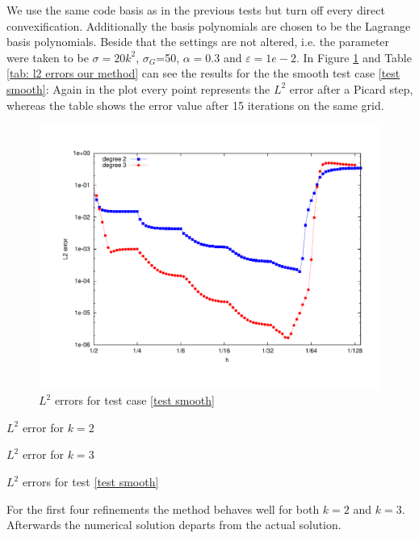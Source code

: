 We use the same code basis as in the previous tests but turn off every direct convexification. Additionally the basis polynomials are chosen to be the Lagrange basis polynomials. Beside that the settings are not altered, i.e. the parameter were taken to be $\sigma = 20 k^2$, $\sigma_G$=50, $\alpha=0.3$ and $\varepsilon = 1e-2$. 
In Figure \ref{fig: l2 errors test smooth ourMethod} and Table \ref{tab: l2 errors our method} can see the results for the the smooth test case \ref{test smooth}: Again in the plot every point represents the $L^2$ error after a Picard step, whereas the table shows the error value after 15 iterations on the same grid.
\begin{figure}[H]
	\centering
	\includegraphics[scale =0.4]{plots/MA1.pdf}
	\caption{$L^2$ errors for test case \ref{test smooth}}
	\label{fig: l2 errors test smooth ourMethod}
\end{figure}
\begin{table}[H]
	\centering
	\begin{subtable}[b]{0.45\textwidth}
		\centering
		\caption{$L^2$ error for $k=2$}
	\end{subtable}
	\begin{subtable}[b]{0.45\textwidth}
		\centering
		\caption{$L^2$ error for $k=3$}
	\end{subtable}
	\caption{$L^2$ errors for test \ref{test smooth}}
	\label{tab: l2 errors our method}
\end{table}
 For the first four refinements the method behaves well for both $k=2$ and $k=3$. Afterwards the numerical solution departs from the actual solution.
 
